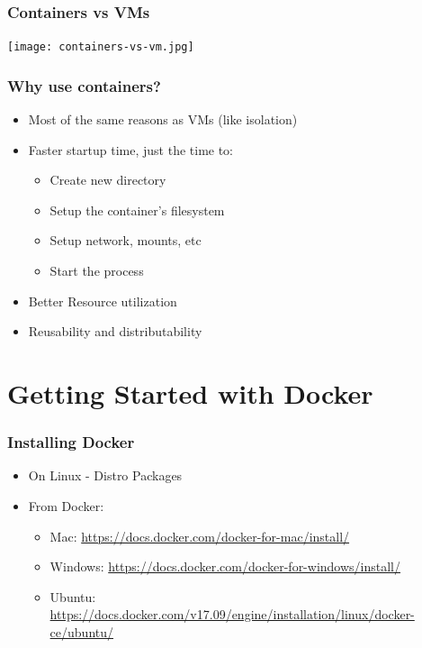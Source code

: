 \documentclass[aspectratio=169,11pt,hyperref={colorlinks=true}]{beamer}
\begin{document}
\begin{frame}
    \frametitle{Containers vs VMs}
    \centering
    \texttt{[image: containers-vs-vm.jpg]}
\end{frame}

\begin{frame}
    \frametitle{Why use containers?}
    \begin{itemize}
        \item Most of the same reasons as VMs (like isolation)
        \item Faster startup time, just the time to:
            \begin{itemize}
                \item Create new directory
                \item Setup the container's filesystem
                \item Setup network, mounts, etc
                \item Start the process
            \end{itemize}
        \item Better Resource utilization
        \item Reusability and distributability
    \end{itemize}
\end{frame}

\section{Getting Started with Docker}
\begin{frame}
    \frametitle{Installing Docker}
    \begin{itemize}
        \item On Linux - Distro Packages
        \item From Docker:
            \begin{itemize}
                \item Mac: \href{https://docs.docker.com/docker-for-mac/install/}{https://docs.docker.com/docker-for-mac/install/}
                \item Windows: \href{https://docs.docker.com/docker-for-windows/install/}{https://docs.docker.com/docker-for-windows/install/}
                \item Ubuntu: \href{https://docs.docker.com/v17.09/engine/installation/linux/docker-ce/ubuntu/}{https://docs.docker.com/v17.09/engine/installation/linux/docker-ce/ubuntu/}
            \end{itemize}
    \end{itemize}
\end{frame}
\end{document}
